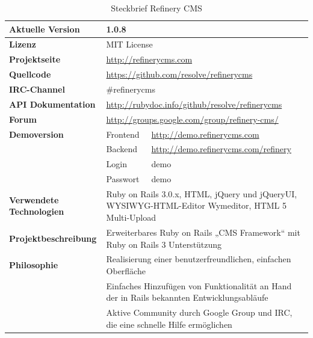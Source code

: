 \begin{table}[!h]
\caption{Steckbrief Refinery CMS}
\begin{tabular}[!ht]{|l|l|l|}
\hline
\textbf{Aktuelle Version} & \multicolumn{2}{p{10cm}|}{1.0.8} \\
\hline
\textbf{Lizenz} & \multicolumn{2}{p{10cm}|}{MIT License} \\
\hline
\textbf{Projektseite} & \multicolumn{2}{p{10cm}|}{\href{http://refinerycms.com}{http://refinerycms.com}} \\
\hline
\textbf{Quellcode} & \multicolumn{2}{p{10cm}|}{\href{https://github.com/resolve/refinerycms}{https://github.com/resolve/refinerycms}} \\
\hline
\textbf{IRC-Channel} & \multicolumn{2}{p{10cm}|}{\#refinerycms} \\
\hline
\textbf{API Dokumentation} & \multicolumn{2}{p{10cm}|}{\href{http://rubydoc.info/github/resolve/refinerycms}{http://rubydoc.info/github/resolve/refinerycms}} \\
\hline
\textbf{Forum} & \multicolumn{2}{p{10cm}|}{\href{http://groups.google.com/group/refinery-cms/}{http://groups.google.com/group/refinery-cms/}} \\
\hline
\textbf{Demoversion} & Frontend & \href{http://demo.refinerycms.com}{http://demo.refinerycms.com} \\
\cline{2-3}
& Backend & \href{http://demo.refinerycms.com/refinery}{http://demo.refinerycms.com/refinery} \\
\cline{2-3}
& Login & demo \\
\cline{2-3}
& Passwort & demo \\
\hline
\textbf{Verwendete Technologien} & \multicolumn{2}{p{10cm}|}{Ruby on Rails 3.0.x, HTML, jQuery und jQueryUI, WYSIWYG-HTML-Editor Wymeditor, HTML 5 Multi-Upload} \\
\hline
\textbf{Projektbeschreibung} & \multicolumn{2}{p{10cm}|}{Erweiterbares Ruby on Rails „CMS Framework“ mit  Ruby on Rails 3 Unterstützung} \\
\hline
\textbf{Philosophie} & \multicolumn{2}{p{10cm}|}{Realisierung einer benutzerfreundlichen, einfachen Oberfläche} \\
& \multicolumn{2}{p{10cm}|}{Einfaches Hinzufügen von Funktionalität an Hand der in Rails bekannten Entwicklungsabläufe}\\
& \multicolumn{2}{p{10cm}|}{Aktive Community durch Google Group und IRC, die eine schnelle Hilfe ermöglichen}\\
\hline
\end{tabular}
\end{table}
